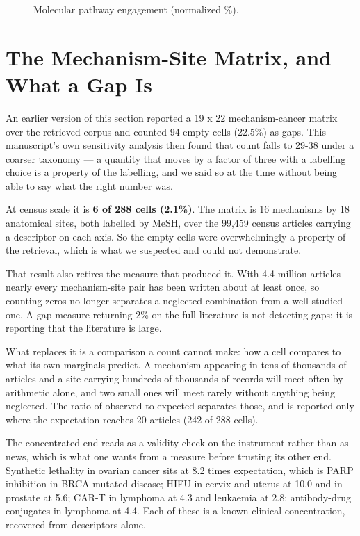 \documentclass[11pt,twoside,openright]{report}
\begin{document}
\begin{figure}[tbp]
\setcounter{figure}{3}
\caption{Molecular pathway engagement (normalized \%).}
\label{fig:fig4_molecular_overlap}
\end{figure}

\section{The Mechanism-Site Matrix, and What a Gap Is}

An earlier version of this section reported a 19 x 22 mechanism-cancer matrix over the retrieved corpus and counted 94 empty cells (22.5\%) as gaps. This manuscript's own sensitivity analysis then found that count falls to 29-38 under a coarser taxonomy --- a quantity that moves by a factor of three with a labelling choice is a property of the labelling, and we said so at the time without being able to say what the right number was.

At census scale it is \textbf{6 of 288 cells (2.1\%)}. The matrix is 16 mechanisms by 18 anatomical sites, both labelled by MeSH, over the 99,459 census articles carrying a descriptor on each axis. So the empty cells were overwhelmingly a property of the retrieval, which is what we suspected and could not demonstrate.

That result also retires the measure that produced it. With 4.4 million articles nearly every mechanism-site pair has been written about at least once, so counting zeros no longer separates a neglected combination from a well-studied one. A gap measure returning 2\% on the full literature is not detecting gaps; it is reporting that the literature is large.

What replaces it is a comparison a count cannot make: how a cell compares to what its own marginals predict. A mechanism appearing in tens of thousands of articles and a site carrying hundreds of thousands of records will meet often by arithmetic alone, and two small ones will meet rarely without anything being neglected. The ratio of observed to expected separates those, and is reported only where the expectation reaches 20 articles (242 of 288 cells).

The concentrated end reads as a validity check on the instrument rather than as news, which is what one wants from a measure before trusting its other end. Synthetic lethality in ovarian cancer sits at 8.2 times expectation, which is PARP inhibition in BRCA-mutated disease; HIFU in cervix and uterus at 10.0 and in prostate at 5.6; CAR-T in lymphoma at 4.3 and leukaemia at 2.8; antibody-drug conjugates in lymphoma at 4.4. Each of these is a known clinical concentration, recovered from descriptors alone.
\end{document}
